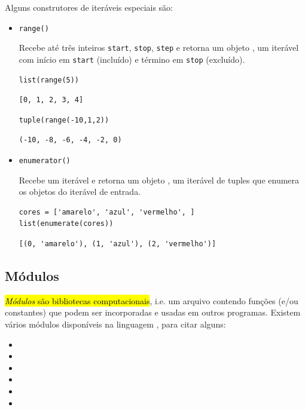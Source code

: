 Alguns construtores de iteráveis especiais são:
\begin{itemize}
\item \lstinline+range()+ 

  Recebe até três inteiros \lstinline+start+, \lstinline+stop+, \lstinline+step+ e retorna um objeto {\PYTHONrange}, um iterável com início em \lstinline+start+ (incluído) e término em \lstinline+stop+ (excluído).

\begin{lstlisting}[xrightmargin=2.5em]
list(range(5))
\end{lstlisting}

\begin{verbatim}
[0, 1, 2, 3, 4]
\end{verbatim}

\begin{lstlisting}[xrightmargin=2.5em]
tuple(range(-10,1,2))
\end{lstlisting}

\begin{verbatim}
(-10, -8, -6, -4, -2, 0)
\end{verbatim}


\item \lstinline+enumerator()+ 

  Recebe um iterável e retorna um objeto {\PYTHONenumerate}, um iterável de tuples que enumera os objetos do iterável de entrada.

\begin{lstlisting}[xrightmargin=2.5em]
cores = ['amarelo', 'azul', 'vermelho', ]
list(enumerate(cores))
\end{lstlisting}

\begin{verbatim}
[(0, 'amarelo'), (1, 'azul'), (2, 'vermelho')]
\end{verbatim}

\end{itemize}

\subsection{Módulos}

\hl{\emph{Módulos} são bibliotecas computacionais}, i.e. um arquivo contendo funções (e/ou constantes) que podem ser incorporadas e usadas em outros programas. Existem vários módulos disponíveis na linguagem {\python}, para citar alguns:
\begin{itemize}
\item {\PYTHONmath} 
\item {\PYTHONrandom} 
\item {\PYTHONnumpy} 
\item {\PYTHONmatplotlib} 
\item {\PYTHONsympy} 
\item {\PYTHONtorch} 
\end{itemize}

